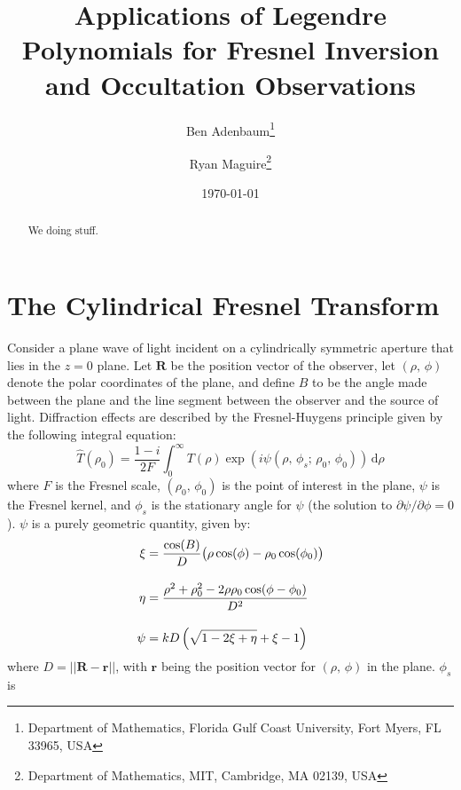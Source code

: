 \documentclass{article}
\title{%
    Applications of Legendre Polynomials for
    Fresnel Inversion and Occultation Observations%
}
\author{%
    Ben Adenbaum\footnote{%
        Department of Mathematics,
        Florida Gulf Coast University, Fort Myers, FL 33965, USA
    }
    \and
    Ryan Maguire\footnote{%
        Department of Mathematics,
        MIT, Cambridge, MA 02139, USA
    }
}
\date{\today}
\theoremstyle{plain}
\begin{document}
    \maketitle
    \begin{abstract}
        We doing stuff.
    \end{abstract}
    \tableofcontents
    \section{The Cylindrical Fresnel Transform}
        Consider a plane wave of light incident on a cylindrically symmetric
        aperture that lies in the $z=0$ plane. Let $\mathbf{R}$ be the position
        vector of the observer, let $(\rho,\,\phi)$ denote the polar coordinates
        of the plane, and define $B$ to be the angle made between the plane and
        the line segment between the observer and the source of light.
        Diffraction effects are described by the Fresnel-Huygens principle
        given by the following integral equation:
        \begin{equation}
            \hat{T}(\rho_{0})
            =\frac{1-i}{2F}\int_{0}^{\infty}
                T(\rho)\exp\left(
                    i\psi\left(\rho,\,\phi_{s};\,\rho_{0},\,\phi_{0}\right)
                \right)\,\textrm{d}\rho
        \end{equation}
        where $F$ is the Fresnel scale,
        $(\rho_{0},\,\phi_{0})$ is the point of interest in the plane,
        $\psi$ is the Fresnel kernel, and $\phi_{s}$ is the stationary
        angle for $\psi$ (the solution to $\partial\psi/\partial\phi=0$).
        $\psi$ is a purely geometric quantity, given by:
        \begin{subequations}
            \begin{align}
                \xi
                &=\frac{\cos(B)}{D}\big(
                    \rho\cos(\phi)-\rho_{0}\cos(\phi_{0})
                \big)\\[1em]
                \eta
                &=\frac{%
                    \rho^{2}+\rho_{0}^{2}-2\rho\rho_{0}\cos(\phi-\phi_{0})%
                }{D^{2}}\\[1em]
                \psi
                &=kD\left(\sqrt{1-2\xi+\eta}+\xi-1\right)
            \end{align}
        \end{subequations}
        where $D=||\mathbf{R}-\mathbf{r}||$, with $\mathbf{r}$ being the
        position vector for $(\rho,\,\phi)$ in the plane. $\phi_{s}$ is
\end{document}

